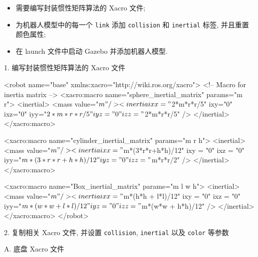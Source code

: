 \documentclass[openany, fontset=windowsold]{ctexbook}
\theoremstyle{kaiti}
\theoremstyle{normal}
\begin{document}
\begin{itemize}
  \item 需要编写封装惯性矩阵算法的 Xacro 文件;
  \item 为机器人模型中的每一个 \verb|link| 添加 \verb|collision| 和 \verb|inertial| 标签, 并且重置颜色属性;
  \item 在 launch 文件中启动 Gazebo 并添加机器人模型.
\end{itemize}

1. 编写封装惯性矩阵算法的 Xacro 文件

\begin{xml}
  <robot name="base" xmlns:xacro="http://wiki.ros.org/xacro">
    <!-- Macro for inertia matrix -->
    <xacro:macro name="sphere_inertial_matrix" params="m r">
        <inertial>
            <mass value="${m}" />
            <inertia ixx="${2*m*r*r/5}" ixy="0" ixz="0"
                iyy="${2*m*r*r/5}" iyz="0" 
                izz="${2*m*r*r/5}" />
        </inertial>
    </xacro:macro>

    <xacro:macro name="cylinder_inertial_matrix" params="m r h">
        <inertial>
            <mass value="${m}" />
            <inertia ixx="${m*(3*r*r+h*h)/12}" ixy = "0" ixz = "0"
                iyy="${m*(3*r*r+h*h)/12}" iyz = "0"
                izz="${m*r*r/2}" /> 
        </inertial>
    </xacro:macro>

    <xacro:macro name="Box_inertial_matrix" params="m l w h">
      <inertial>
              <mass value="${m}" />
              <inertia ixx="${m*(h*h + l*l)/12}" ixy = "0" ixz = "0"
                  iyy="${m*(w*w + l*l)/12}" iyz= "0"
                  izz="${m*(w*w + h*h)/12}" />
      </inertial>
    </xacro:macro>
  </robot>
\end{xml}

2. 复制相关 Xacro 文件, 并设置 \verb|collision|, \verb|inertial| 以及 \verb|color| 等参数

A. 底盘 Xacro 文件
\end{document}
